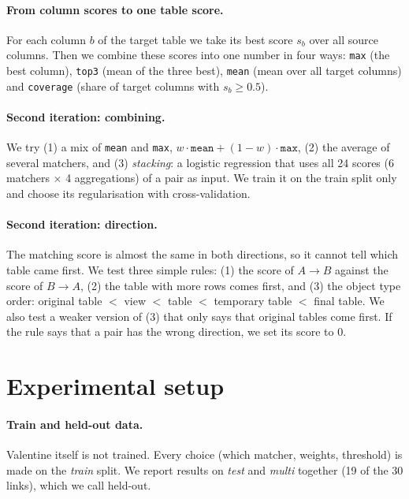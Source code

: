 \documentclass[11pt,a4paper]{article}
\begin{document}
\paragraph{From column scores to one table score.} For each column $b$ of the target table we take its best score
$s_b$ over all source columns. Then we combine these scores into one number in four ways: \texttt{max} (the best
column), \texttt{top3} (mean of the three best), \texttt{mean} (mean over all target columns) and \texttt{coverage}
(share of target columns with $s_b \geq 0.5$).

\paragraph{Second iteration: combining.} We try (1) a mix of \texttt{mean} and \texttt{max},
$w \cdot \texttt{mean} + (1-w) \cdot \texttt{max}$, (2) the average of several matchers, and (3) \emph{stacking}: a
logistic regression that uses all 24 scores (6 matchers $\times$ 4 aggregations) of a pair as input. We train it on
the train split only and choose its regularisation with cross-validation.

\paragraph{Second iteration: direction.} The matching score is almost the same in both directions, so it cannot
tell which table came first. We test three simple rules: (1) the score of $A \rightarrow B$ against the score of
$B \rightarrow A$, (2) the table with more rows comes first, and (3) the object type order: original table $<$ view
$<$ table $<$ temporary table $<$ final table. We also test a weaker version of (3) that only says that original
tables come first. If the rule says that a pair has the wrong direction, we set its score to 0.

\section{Experimental setup}\label{sec:setup}

\paragraph{Train and held-out data.} Valentine itself is not trained. Every choice (which matcher, weights,
threshold) is made on the \emph{train} split. We report results on \emph{test} and \emph{multi} together (19 of the
30 links), which we call held-out.
\end{document}
